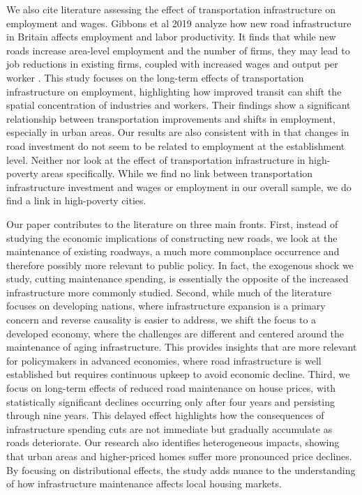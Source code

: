 We also cite literature assessing the effect of transportation infrastructure on employment and wages. Gibbons et al 2019 analyze how new road infrastructure in Britain affects employment and labor productivity. It finds that while new roads increase area-level employment and the number of firms, they may lead to job reductions in existing firms, coupled with increased wages and output per worker \citep{duranton2012}. This study focuses on the long-term effects of transportation infrastructure on employment, highlighting how improved transit can shift the spatial concentration of industries and workers. Their findings show a significant relationship between transportation improvements and shifts in employment, especially in urban areas. Our results are also consistent with \cite{gibbons2019new} in that changes in road investment do not seem to be related to employment at the establishment level.  Neither \cite{dalenberg1995effects} nor \cite{gibbons2019new} look at the effect of transportation infrastructure in high-poverty areas specifically.  While we find no link between transportation infrastructure investment and wages or employment in our overall sample, we do find a link in high-poverty cities.

Our paper contributes to the literature on three main fronts. First, instead of studying the economic implications of constructing new roads, we look at the maintenance of existing roadways, a much more commonplace occurrence and therefore possibly more relevant to public policy. In fact, the exogenous shock we study, cutting maintenance spending, is essentially the opposite of the increased infrastructure more commonly studied.  
Second, while much of the literature focuses on developing nations, where infrastructure expansion is a primary concern and reverse causality is easier to address, we shift the focus to a developed economy, where the challenges are different and centered around the maintenance of aging infrastructure. This provides insights that are more relevant for policymakers in advanced economies, where road infrastructure is well established but requires continuous upkeep to avoid economic decline.
Third, we focus on long-term effects of reduced road maintenance on house prices, with statistically significant declines occurring only after four years and persisting through nine years. This delayed effect highlights how the consequences of infrastructure spending cuts are not immediate but gradually accumulate as roads deteriorate. Our research also identifies heterogeneous impacts, showing that urban areas and higher-priced homes suffer more pronounced price declines. By focusing on distributional effects, the study adds nuance to the understanding of how infrastructure maintenance affects local housing markets.

